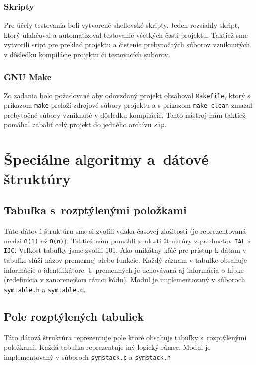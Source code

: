 \documentclass[a4paper, 11pt]{article}
\begin{document}
    \subsubsection{Skripty}
    Pre účely testovania boli vytvorené shellovské skripty. Jeden rozsiahly skript, ktorý uľahčoval a automatizoval
    testovanie všetkých častí projektu. Taktiež sme vytvorili sript pre preklad projektu a čistenie prebytočných súborov
    vzniknutých v dôsledku kompilácie projektu či testovacích suborov.

    \subsubsection{GNU Make}
    Zo zadania bolo požadované aby odovzdaný projekt obsahoval \texttt{Makefile}, ktorý s príkazom
    \texttt{make} preloží zdrojové súbory projektu a s príkazom \texttt{make clean} zmazal prebytočné súbory vzniknuté v dôsledku kompilácie.
    Tento nástroj nám taktiež pomáhal zabaliť celý projekt do jedného archívu \texttt{zip}.





    \section{Špeciálne algoritmy a~dátové štruktúry}

    \subsection{Tabuľka s~rozptýlenými položkami}
    Túto dátovú štruktúru sme si zvolili vďaka časovej zložitosti
    (je reprezentovaná medzi \texttt{O(1)} až \texttt{O(n)}). Taktiež nám pomohli znalosti štruktúry z
    predmetov \texttt{IAL} a \texttt{IJC}. Veľkosť tabuľky jsme zvolili 101.
    Ako unikátny kľúč pre prístup k dátam v tabuľke slúži názov premennej alebo funkcie.
    Každý záznam v tabuľke obsahuje informácie o identifikátore. U premenných je uchovávaná aj informácia
    o hĺbke (redefinícia v zanorenejšom rámci kódu). Modul je implementovaný v súboroch
    \texttt{symtable.h} a \texttt{symtable.c}.


    \subsection{Pole rozptýlených tabuliek}
    Táto dátová štruktúra reprezentuje pole ktoré obsahuje tabuľky s~rozptýlenými položkami. Každá tabuľka reprezentuje
    iný logický rámec.
    Modul je implementovaný v súboroch \texttt{symstack.c} a \texttt{symstack.h}
\end{document}
